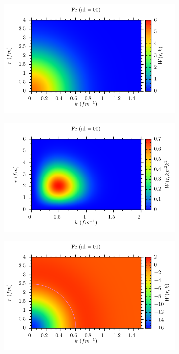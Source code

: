 \documentclass[11pt,twoside]{book}
\begin{document}
\begin{figure}
\centering
 \begin{subfigure}[b]{0.49\textwidth} 
 	\includegraphics[width=\textwidth]{./figuren/Fe_wigner_00.pdf}  
 \end{subfigure}
 \begin{subfigure}[b]{0.49\textwidth} 
 	\includegraphics[width=\textwidth]{./figuren/Fe_wigner_00prob.pdf}  
 \end{subfigure}  
 \begin{subfigure}[b]{0.49\textwidth} 
 	\includegraphics[width=\textwidth]{./figuren/Fe_wigner_01.pdf}  

\end{subfigure}
\end{figure}
\end{document}
